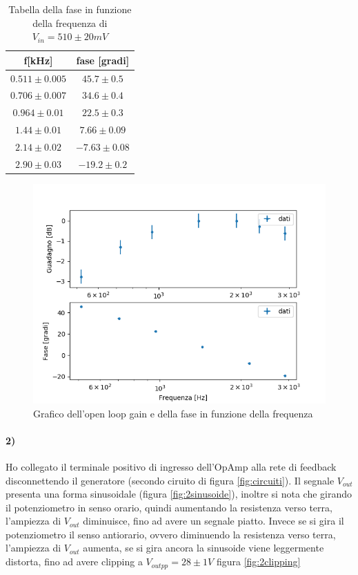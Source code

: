 \documentclass{article}
\begin{document}
	\begin{table}
		\centering
		\begin{tabular}{cc}
			\hline
			f[kHz]&fase [gradi] \\
			\hline
			$0.511\pm0.005$ & $45.7\pm0.5$ \\
			$0.706\pm0.007$ & $34.6\pm0.4$ \\
			$0.964\pm0.01$ & $22.5\pm0.3$ \\
			$1.44\pm0.01$ & $7.66\pm0.09$ \\
			$2.14\pm0.02$ & $-7.63\pm0.08$ \\
			$2.90\pm0.03$ & $-19.2\pm0.2$ \\
		\end{tabular}
	\caption{Tabella della fase in funzione della frequenza di $V_{in}=510\pm20mV$}
	\label{tab:fase}
	\end{table}

\begin{figure}
	\centering
	\includegraphics[width=1\linewidth]{figure/grafico.png}
	\caption{Grafico dell'open loop gain e della fase in funzione della frequenza}
	\label{fig:grafico}
\end{figure}

\paragraph{2)}
Ho collegato il terminale positivo di ingresso dell'OpAmp alla rete di feedback disconnettendo il generatore (secondo ciruito di figura \ref{fig:circuiti}). Il segnale $V_{out}$ presenta una forma sinusoidale (figura \ref{fig:2sinusoide}), inoltre si nota che girando il potenziometro in senso orario, quindi aumentando la resistenza verso terra, l'ampiezza di $V_{out}$ diminuisce, fino ad avere un segnale piatto. Invece se si gira il potenziometro il senso antiorario, ovvero diminuendo la resistenza verso terra, l'ampiezza di $V_{out}$ aumenta, se si gira ancora la sinusoide viene leggermente distorta, fino ad avere clipping a $V_{outpp}=28\pm1 V$ figura \ref{fig:2clipping}
\end{document}
